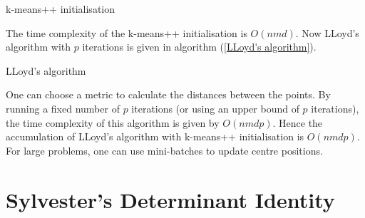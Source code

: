 \documentclass[12pt,a4paper,oneside]{book}
\makeatletter
\def\BState{\State\hskip-\ALG@thistlm}
\makeatother
\begin{document}
{\begin{algorithm}
\caption{k-means++ initialisation}\label{k-means++ initialisation}
\end{algorithm}


The time complexity of the k-means++ initialisation is $O(n m d)$. Now LLoyd's algorithm with $p$ iterations is given in algorithm (\ref{LLoyd's algorithm}).

\begin{algorithm}
\caption{LLoyd's algorithm}\label{LLoyd's algorithm}
\end{algorithm}

One can choose a metric to calculate the distances between the points. By running a fixed number of $p$ iterations (or using an upper bound of $p$ iterations), the time complexity of this algorithm is given by $O(n m d p)$.  Hence the accumulation of LLoyd's algorithm with k-means++ initialisation is $O(n m d p)$. For large problems, one can use mini-batches to update centre positions.  

\section{Sylvester's Determinant Identity}\label{Sylvester}

}
\end{document}
